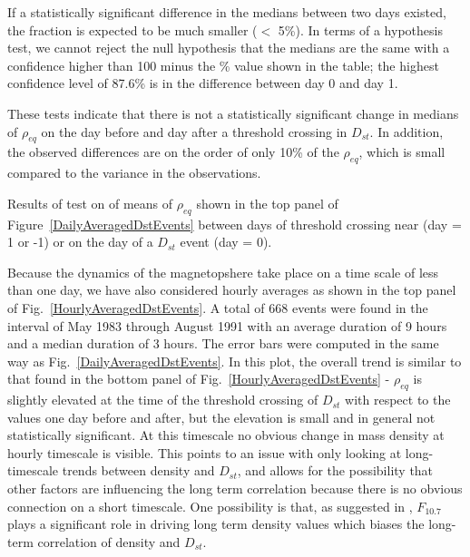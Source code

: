 \documentclass[10pt,twocolumn]{article}
\begin{document}
If a statistically significant difference in the medians between two days existed, the fraction is expected to be much smaller ($<$ 5\%).  In terms of a hypothesis test, we cannot reject the null hypothesis that the medians are the same with a confidence higher than 100 minus the \% value shown in the table; the highest confidence level of 87.6\% is in the difference between day 0 and day 1.

These tests indicate that there is not a statistically significant change in medians of $\rho_{eq}$ on the day before and day after a threshold crossing in $D_{st}$.  In addition, the observed differences are on the order of only 10\% of the $\rho_{eq}$, which is small compared to the variance in the observations.  

%

\begin{table}
\small


\caption{Results of test on of means of $\rho_{eq}$ shown in the top panel of Figure~\ref{DailyAveragedDstEvents} between days of threshold crossing  near (day = 1 or -1) or on the day of a $D_{st}$ event (day = 0).}
\label{BootstrapDifferenceTable}
\end{table}

Because the dynamics of the magnetopshere take place on a time scale of less than one day, we have also considered hourly averages as shown in the top panel of Fig.~\ref{HourlyAveragedDstEvents}.  A total of 668 events were found in the interval of May 1983 through August 1991 with an average duration of 9 hours and a median duration of 3 hours.  The error bars were computed in the same way as Fig.~\ref{DailyAveragedDstEvents}.  In this plot, the overall trend is similar to that found in the bottom panel of Fig.~\ref{HourlyAveragedDstEvents} - $\rho_{eq}$ is slightly elevated at the time of the threshold crossing of $D_{st}$ with respect to the values one day before and after, but the elevation is small and in general not statistically significant.  At this timescale no obvious change in mass density at hourly timescale is visible. This points to an issue with only looking at long-timescale trends between density and $D_{st}$, and allows for the possibility that other factors are influencing the long term correlation because there is no obvious connection on a short timescale.  One possibility is that, as suggested in \cite{Takahashi2010}, $F_{10.7}$ plays a significant role in driving long term density values which biases the long-term correlation of density and $D_{st}$.
\end{document}
